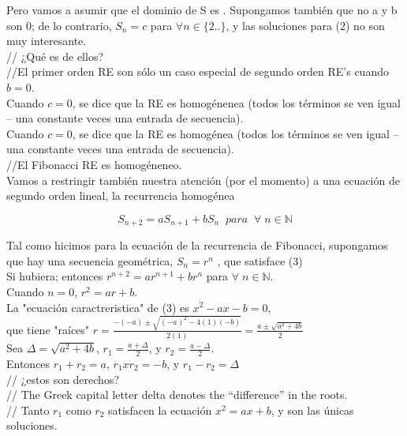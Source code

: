 \documentclass{article}
\begin{document}
Pero vamos a asumir que el dominio de S es . Supongamos también que no a y b son 0; de lo contrario, $S_n = c$ para $\forall n \in  \{2.. \}$, y las soluciones para (2) no son muy interesante.\\

// ¿Qué es de ellos?\\
//El primer orden RE son sólo un caso especial de segundo orden RE’s cuando $b = 0$.\\
Cuando $c = 0$, se dice que la RE es homogénenea (todos los términos se ven igual – una constante veces una entrada de secuencia).\\

Cuando $c = 0$, se dice que la RE es homogénea (todos los términos se ven igual – una constante veces una entrada de secuencia).\\

//El Fibonacci RE es homogéneneo. \\

Vamos a restringir también nuestra atención (por el momento) a una ecuación de segundo orden lineal, la recurrencia homogénea

\begin{equation}
S_{n+2} = aS_{n+1} + bS_{n}\;\; \textit{para} \;\; \forall\; n \in \mathbb{N}
\end{equation}

Tal como hicimos para la ecuación de la recurrencia de Fibonacci, supongamos que hay una secuencia geométrica, $S_n = r^n$ , que satisface (3)\\

Si hubiera; entonces $r^{n+2} = ar^{n+1} + br^{n}$ para $\forall \; n \in \mathbb{N}$.\\

Cuando $n = 0$, \;\;\; $r^2 = ar + b$.\\

La "ecuación caractreristica" de (3) es $x^2 -ax-b=0$,\\

que tiene "raíces" $r = \frac{-(-a) \pm \sqrt{(-a)^2 - 4(1)(-b)}}{2(1)} = \frac{a \pm \sqrt{a^2 + 4b}}{2}$\\

Sea $\Delta = \sqrt{a^2 + 4b}$, $r_1 = \frac{a + \Delta}{2}$, y $r_2 = \frac{a - \Delta}{2}$.\\

Entonces $r_1 + r_2 = a$, $r_1 x r_2 = -b$, y $r_1 - r_2 = \Delta $ \\

// ¿estos son derechos?\\
// The Greek capital letter delta denotes the “difference” in the roots.\\
// Tanto $r_1$ como $r_2$ satisfacen la ecuación $x^2 = ax + b$, y son las únicas soluciones.
\end{document}
